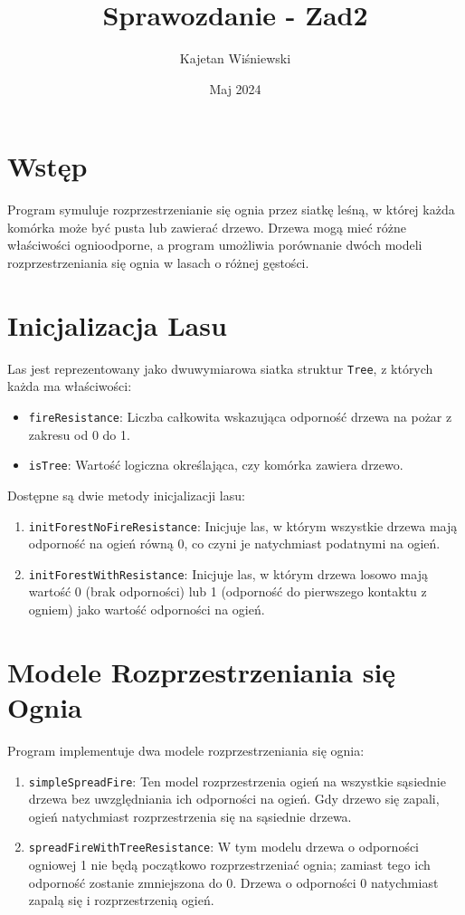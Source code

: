 \documentclass{article}
\title{Sprawozdanie - Zad2}
\author{Kajetan Wiśniewski}
\date{Maj 2024}
\begin{document}
\maketitle

\section*{Wstęp}
Program symuluje rozprzestrzenianie się ognia przez siatkę leśną, w której każda komórka może być pusta lub zawierać drzewo. Drzewa mogą mieć różne właściwości ognioodporne, a program umożliwia porównanie dwóch modeli rozprzestrzeniania się ognia w lasach o różnej gęstości.

\section*{Inicjalizacja Lasu}
Las jest reprezentowany jako dwuwymiarowa siatka struktur \texttt{Tree}, z których każda ma właściwości:
\begin{itemize}
    \item \texttt{fireResistance}: Liczba całkowita wskazująca odporność drzewa na pożar z zakresu od 0 do 1.
    \item \texttt{isTree}: Wartość logiczna określająca, czy komórka zawiera drzewo.
\end{itemize}
Dostępne są dwie metody inicjalizacji lasu:
\begin{enumerate}
    \item \texttt{initForestNoFireResistance}: Inicjuje las, w którym wszystkie drzewa mają odporność na ogień równą 0, co czyni je natychmiast podatnymi na ogień.
    \item \texttt{initForestWithResistance}: Inicjuje las, w którym drzewa losowo mają wartość 0 (brak odporności) lub 1 (odporność do pierwszego kontaktu z ogniem) jako wartość odporności na ogień.
\end{enumerate}

\section*{Modele Rozprzestrzeniania się Ognia}
Program implementuje dwa modele rozprzestrzeniania się ognia:
\begin{enumerate}
    \item \texttt{simpleSpreadFire}: Ten model rozprzestrzenia ogień na wszystkie sąsiednie drzewa bez uwzględniania ich odporności na ogień. Gdy drzewo się zapali, ogień natychmiast rozprzestrzenia się na sąsiednie drzewa.
    \item \texttt{spreadFireWithTreeResistance}: W tym modelu drzewa o odporności ogniowej 1 nie będą początkowo rozprzestrzeniać ognia; zamiast tego ich odporność zostanie zmniejszona do 0. Drzewa o odporności 0 natychmiast zapalą się i rozprzestrzenią ogień.
\end{enumerate}
\end{document}

